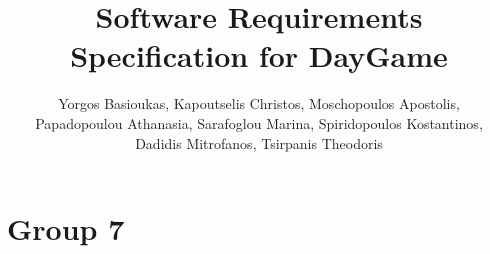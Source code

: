 \documentclass[12pt]{report}
\title{Software Requirements Specification for DayGame}
\author{Yorgos Basioukas, Kapoutselis Christos, Moschopoulos Apostolis, \\
Papadopoulou Athanasia, Sarafoglou Marina, Spiridopoulos Kostantinos, \\
Dadidis Mitrofanos, Tsirpanis Theodoris}
\date{}
\renewcommand{\_}{\kern-1.5pt\textunderscore\kern-1.5pt}
\begin{document}
\maketitle
\setlength{\parskip}{2.04pt}
\par

\chapter{Group 7}\par


\vspace{\baselineskip}

\vspace{\baselineskip}

\vspace{\baselineskip}

\vspace{\baselineskip}

\vspace{\baselineskip}

\vspace{\baselineskip}

\vspace{\baselineskip}

\vspace{\baselineskip}

\vspace{\baselineskip}

\vspace{\baselineskip}

\vspace{\baselineskip}


\end{document}
